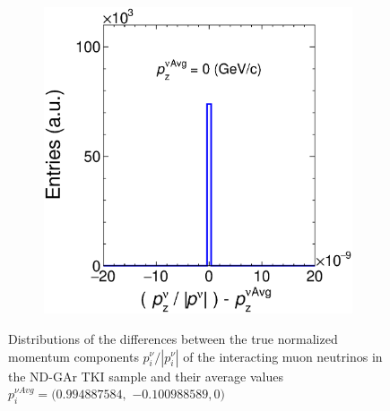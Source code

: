 \begin{figure}[t]
\begin{subfigure}[b]{0.32\textwidth}
         \caption{}
        \label{fig:NupyNorm}
     \end{subfigure}
     \begin{subfigure}[b]{0.32\textwidth}
         \centering
         \includegraphics[width=\textwidth]{figures/ch6-TKI/Properties/NupzNorm.eps}
         \caption{}
         \label{fig:NupzNorm.eps}
     \end{subfigure}
        \caption[Distributions of the differences between the true normalized momentum components of the muon neutrinos and their average values.]{Distributions of the differences between the true normalized momentum components $p^\nu_i/|p^\nu_i|$ of the interacting muon neutrinos in the ND-GAr TKI sample and their average values $p^{\nu Avg}_i= (0.994887584,$ $ -0.100988589 , 0)$} \label{fig:NupNorm}
\end{figure}
